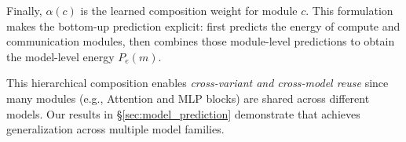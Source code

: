 Finally, $\alpha(c)$ is the learned composition weight for module $c$. 
This formulation makes the bottom-up prediction explicit: \sys{} first predicts the energy of compute and communication modules, then combines those module-level predictions to obtain the model-level energy $P_e(m)$.

This hierarchical composition enables \emph{cross-variant and cross-model reuse} since many modules (e.g., Attention and MLP blocks) are shared across different models. 
Our results in \S\ref{sec:model_prediction} demonstrate that \sys{} achieves  generalization across multiple model families.
